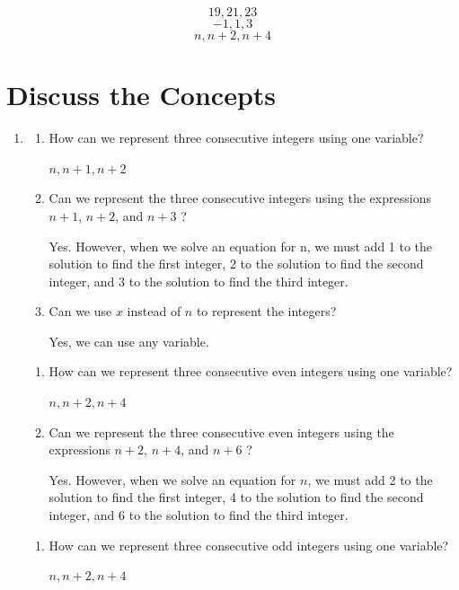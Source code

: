 \documentclass{ximera}
\begin{document}
$$19, 21, 23$$
 $$-1, 1, 3$$
$$n, n+2, n+4$$



\section*{Discuss the Concepts}
\begin{enumerate}
  \item
  \begin{enumerate}
  \item
  How can we represent three consecutive integers using one variable?
\begin{solution}
$n, n+1, n+2$
\end{solution}
\item
Can we represent the three consecutive integers using the expressions $n+1$, $n+2$, and $n+3$ ?
\begin{solution}
Yes. However, when we solve an equation for n, we must add 1 to the solution to find the first integer, 2 to the solution to find the second integer, and 3 to the solution to find the third integer.
\end{solution}
 \item
Can we use $x$ instead of $n$ to represent the integers?
\begin{solution}
Yes, we can use any variable.
\end{solution}
\end{enumerate}
\begin{enumerate}
  \item
  How can we represent three consecutive even integers using one variable?
\begin{solution}
$n, n+2, n+4$
\end{solution}
\item
Can we represent the three consecutive even integers using the expressions $n+2$, $n+4$, and $n+6$ ?
\begin{solution}
Yes. However, when we solve an equation for $n$, we must add 2 to the solution to find the first integer, 4 to the solution to find the second integer, and 6 to the solution to find the third integer.
\end{solution}
\end{enumerate}
\begin{enumerate}
  \item  How can we represent three consecutive odd integers using one variable?
\begin{solution}
$n, n+2, n+4$
\end{solution}

\end{enumerate}
\end{enumerate}
\end{document}
